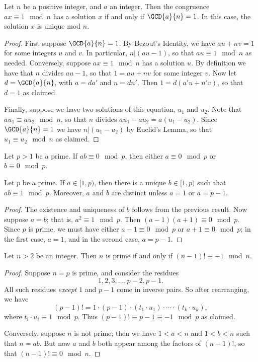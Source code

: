 \documentclass{article}
\begin{document}

\begin{thm}
Let $n$ be a positive integer, and $a$ an integer. Then the congruence $ax \equiv 1 \mod n$ has a solution $x$ if and only if $\GCD{a}{n} = 1$. In this case, the solution $x$ is unique mod $n$.
\end{thm}

\begin{proof}
First suppose $\GCD{a}{n} = 1$. By Bezout's Identity, we have $au + nv = 1$ for some integers $u$ and $v$. In particular, $n|(au - 1)$, so that $au \equiv 1 \mod n$ as needed. Conversely, suppose $ax \equiv 1 \mod n$ has a solution $u$. By definition we have that $n$ divides $au - 1$, so that $1 = au + nv$ for some integer $v$. Now let $d = \GCD{a}{n}$, with $a = da'$ and $n = dn'$. Then $1 = d(a'u + n'v)$, so that $d = 1$ as claimed.

Finally, suppose we have two solutions of this equation, $u_1$ and $u_2$. Note that $au_1 \equiv au_2 \mod n$, so that $n$ divides $au_1 - au_2 = a(u_1 - u_2)$. Since $\GCD{a}{n} = 1$ we have $n|(u_1 - u_2)$ by Euclid's Lemma, so that $u_1 \equiv u_2 \mod n$ as claimed.
\end{proof}

\begin{cor}
Let $p > 1$ be a prime. If $ab \equiv 0 \mod p$, then either $a \equiv 0 \mod p$ or $b \equiv 0 \mod p$.
\end{cor}

\begin{cor}
Let $p$ be a prime. If $a \in [1,p)$, then there is a unique $b \in [1,p)$ such that $ab \equiv 1 \mod p$. Moreover, $a$ and $b$ are distinct unless $a = 1$ or $a = p-1$.
\end{cor}

\begin{proof}
The existence and uniqueness of $b$ follows from the previous result. Now suppose $a = b$; that is, $a^2 \equiv 1 \mod p$. Then $(a-1)(a+1) \equiv 0 \mod p$. Since $p$ is prime, we must have either $a-1 \equiv 0 \mod p$ or $a+1 \equiv 0 \mod p$; in the first case, $a = 1$, and in the second case, $a = p-1$.
\end{proof}

\begin{cor}
Let $n > 2$ be an integer. Then $n$ is prime if and only if $(n-1)! \equiv -1 \mod n$.
\end{cor}

\begin{proof}
Suppose $n = p$ is prime, and consider the residues \[1, 2, 3, \ldots, p-2, p-1.\] All such residues \emph{except} $1$ and $p-1$ come in inverse pairs. So after rearranging, we have \[ (p-1)! = 1 \cdot (p-1) \cdot (t_1 \cdot u_1) \cdot \cdots \cdot (t_k \cdot u_k), \] where $t_i \cdot u_i \equiv 1 \mod p$. Thus $(p-1)! \equiv p-1 \equiv -1 \mod p$ as claimed.

Conversely, suppose $n$ is not prime; then we have $1 < a < n$ and $1 < b < n$ such that $n = ab$. But now $a$ and $b$ both appear among the factors of $(n-1)!$, so that $(n-1)! \equiv 0 \mod n$.
\end{proof}
\end{document}
